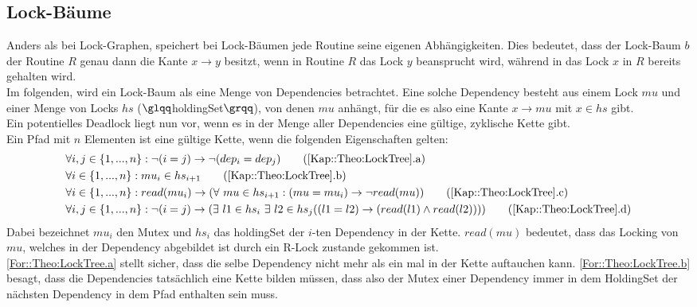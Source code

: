 \subsection{Lock-Bäume} \label{Kap::Theo:LockTree}
Anders als bei Lock-Graphen, speichert bei Lock-Bäumen jede Routine  
seine eigenen Abhängigkeiten. Dies bedeutet, dass der Lock-Baum $b$ der 
Routine $R$ genau dann die Kante $x\to y$ besitzt, wenn in Routine $R$ das 
Lock $y$ beansprucht wird, während in das Lock $x$ in $R$ bereits gehalten wird.\\
Im folgenden, wird ein Lock-Baum als eine Menge von Dependencies betrachtet. 
Eine solche Dependency besteht aus einem Lock $mu$ und einer Menge von Locks $hs$
($\glqq$holdingSet$\grqq$),
von denen $mu$ anhängt, für die es also eine Kante $x \to mu$ mit $x \in hs$ gibt.\\
Ein potentielles Deadlock liegt nun vor, wenn es in der Menge aller Dependencies
eine gültige, zyklische Kette gibt.\\
Ein Pfad mit $n$
Elementen ist eine gültige Kette, wenn die folgenden Eigenschaften gelten:
\begin{align}
  &\forall i, j \in \{1,...,n\}: \lnot (i = j) \rightarrow \lnot (dep_i = dep_j) \tag{\ref{Kap::Theo:LockTree}.a}
  \label{For::Theo:LockTree.a}\\
  &\forall i \in \{1,...,n\}: mu_i \in hs_{i+1} 
  \tag{\ref{Kap::Theo:LockTree}.b}
  \label{For::Theo:LockTree.b}\\
  &\forall i \in \{1,...,n\}: read(mu_i) \rightarrow 
  (\forall\ mu \in hs_{i+1}:(mu = mu_i) \to \lnot read(mu))
  \tag{\ref{Kap::Theo:LockTree}.c}
  \label{For::Theo:LockTree.c}\\
  &\forall i, j \in \{1,...,n\}: \lnot (i = j) \rightarrow 
  (\exists\ l1 \in hs_i\ \exists\ l2 \in hs_j ((l1 = l2) \rightarrow 
  (read(l1) \land read(l2)))) 
  \tag{\ref{Kap::Theo:LockTree}.d}
  \label{For::Theo:LockTree.d}
\end{align}
Dabei bezeichnet $mu_i$ den Mutex und $hs_i$ das holdingSet der $i$-ten 
Dependency in der Kette. $read(mu)$ bedeutet, dass das Locking von $mu$, welches 
in der Dependency abgebildet ist durch ein R-Lock zustande gekommen ist.\\
\eqref{For::Theo:LockTree.a} stellt sicher, dass die selbe 
Dependency nicht mehr als ein mal in der Kette auftauchen kann.  
\eqref{For::Theo:LockTree.b} besagt, dass die Dependencies tatsächlich
eine Kette bilden müssen, dass also der Mutex einer Dependency immer in dem 
HoldingSet der nächsten Dependency in dem Pfad enthalten sein muss. 
